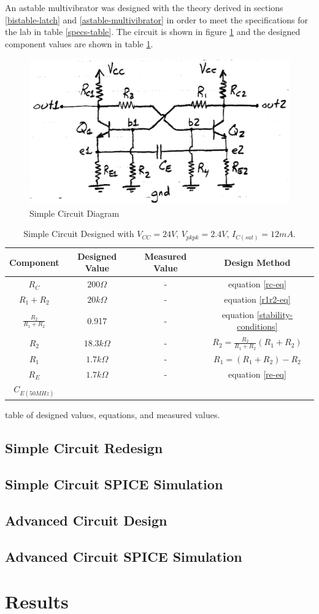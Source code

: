 \documentclass[titlepage, letterpaper, 10.5pt]{article}
\begin{document}
An astable multivibrator was designed with the theory derived in sections
\ref{bistable-latch} and \ref{astable-multivibrator} in order to meet the
specifications for the lab in table \ref{specs-table}.
The circuit is shown in figure \ref{simple-circuit-2}
and the designed component values are shown in table \ref{simple-circuit-design-table}.
\begin{figure}[ht]
	\centering
	\includegraphics[width=.6\textwidth]{diagrams/simple-circuit}
	\caption{Simple Circuit Diagram}
	\label{simple-circuit-2}
\end{figure}

\begin{table}[ht]
\centering
\caption{Simple Circuit Designed with $V_{CC}=24V$, $V_{pkpk}=2.4V$, $I_{C(sat)}=12mA$.}
\begin{tabular}{c | c | c | c}
\hline\hline
Component	&Designed Value	&Measured Value	&Design Method	\\
\hline\hline
$R_{C}$	&$200\Omega$	&-	&equation \ref{rc-eq}	\\
$R_{1}+R_{2}$	&$20k\Omega$	&-	&equation \ref{r1r2-eq}	\\
$\frac{R_{2}}{R_{1}+R_{2}}$	&0.917	&-	&equation \ref{stability-conditions}	\\
$R_{2}$	&$18.3k\Omega$	&-	&$R_{2}=\frac{R_{2}}{R_{1}+R_{2}}(R_{1}+R_{2})$	\\
$R_{1}$	&$1.7k\Omega$	&-	&$R_{1}=(R_{1}+R_{2})-R_{2}$	\\
$R_{E}$	&$1.7k\Omega$	&-	&equation \ref{re-eq}	\\
$C_{E(50MHz)}$	&
\end{tabular}
\label{simple-circuit-design-table}
\end{table}

table of designed values, equations, and measured values.

\subsection{Simple Circuit Redesign}

\subsection{Simple Circuit SPICE Simulation}

\subsection{Advanced Circuit Design}

\subsection{Advanced Circuit SPICE Simulation}

\section{Results}
\end{document}
